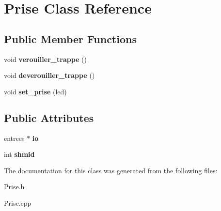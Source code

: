 \hypertarget{classPrise}{}\section{Prise Class Reference}
\label{classPrise}
\subsection*{Public Member Functions}
\begin{DoxyCompactItemize}
\item 
\mbox{\label{classPrise_a3c23e0e69c65fae933baece16637212f}} 
void {\bfseries verouiller\+\_\+trappe} ()
\item 
\mbox{\label{classPrise_a51fefe00c1fe000bb3f432b288d3f38c}} 
void {\bfseries deverouiller\+\_\+trappe} ()
\item 
\mbox{\label{classPrise_a0148de0322f220ad6dafe07ac67af4fb}} 
void {\bfseries set\+\_\+prise} (led)
\end{DoxyCompactItemize}
\subsection*{Public Attributes}
\begin{DoxyCompactItemize}
\item 
\mbox{\label{classPrise_a38a10200a9c39acd3c143d5b81759ed5}} 
entrees $\ast$ {\bfseries io}
\item 
\mbox{\label{classPrise_a64e09ae75aad37d4065b08c7f1b196d8}} 
int {\bfseries shmid}
\end{DoxyCompactItemize}


The documentation for this class was generated from the following files\+:\begin{DoxyCompactItemize}
\item 
Prise.\+h\item 
Prise.\+cpp\end{DoxyCompactItemize}
